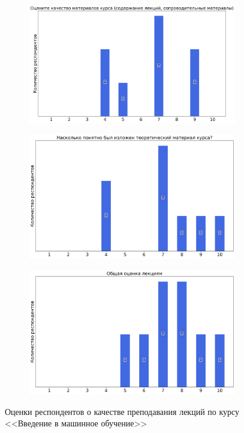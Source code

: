 \begin{figure}[H]
\begin{subfigure}[b]{0.45\textwidth}
			\end{subfigure}
			\begin{subfigure}[b]{0.45\textwidth}
				\centering
				\includegraphics[width=\textwidth]{images/4 course/Введение в машинное обучение/lecturer-marks-Нейчев Р.Г.-1.png}
			\end{subfigure}
			\begin{subfigure}[b]{0.45\textwidth}
				\centering
				\includegraphics[width=\textwidth]{images/4 course/Введение в машинное обучение/lecturer-marks-Нейчев Р.Г.-2.png}
			\end{subfigure}	
			\begin{subfigure}[b]{0.45\textwidth}
				\centering
				\includegraphics[width=\textwidth]{images/4 course/Введение в машинное обучение/lecturer-marks-Нейчев Р.Г.-3.png}
			\end{subfigure}
			\caption{Оценки респондентов о качестве преподавания лекций по курсу <<Введение в машинное обучение>>}
		\end{figure}

